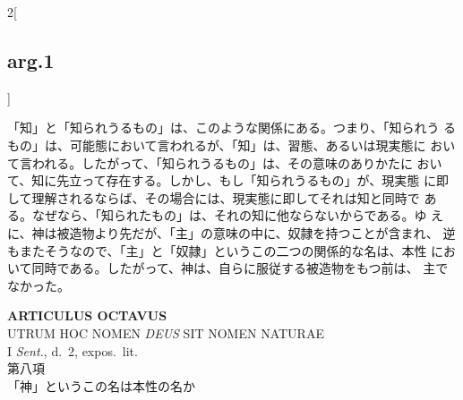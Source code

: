 \documentclass[paper=a4paper,fontsize=10pt,jafontsize=9pt,titlepage]{jlreq}
\begin{document}
\begin{paracol}{2}[\subsection{arg.1}]
\switchcolumn

「知」と「知られうるもの」は、このような関係にある。つまり、「知られう
るもの」は、可能態において言われるが、「知」は、習態、あるいは現実態に
おいて言われる。したがって、「知られうるもの」は、その意味のありかたに
おいて、知に先立って存在する。しかし、もし「知られうるもの」が、現実態
に即して理解されるならば、その場合には、現実態に即してそれは知と同時で
ある。なぜなら、「知られたもの」は、それの知に他ならないからである。ゆ
えに、神は被造物より先だが、「主」の意味の中に、奴隷を持つことが含まれ、
逆もまたそうなので、「主」と「奴隷」というこの二つの関係的な名は、本性
において同時である。したがって、神は、自らに服従する被造物をもつ前は、
主でなかった。

\end{paracol}
\newpage
{}

\begin{center}
{\Large {\bfseries ARTICULUS OCTAVUS}}\\
{\large UTRUM HOC NOMEN {\itshape DEUS} SIT NOMEN NATURAE}\\
{\footnotesize I {\itshape Sent.}, d.~2, expos.~lit.}\\
{\Large 第八項\\「神」というこの名は本性の名か}
\end{center}

{}
\setcounter{section}{8}
\setcounter{subsection}{0}
\end{document}
